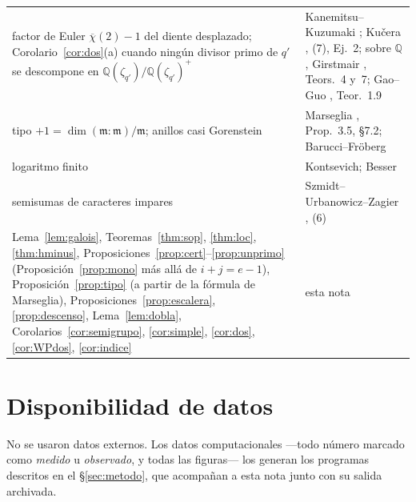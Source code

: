 \documentclass[11pt,a4paper]{article}
\theoremstyle{definition}
\newcommand{\QQ}{\mathbb{Q}}
\begin{document}
\begin{center}
\begin{tabular}{p{}p{}}
factor de Euler $\overline\chi(2)-1$ del diente desplazado; Corolario~\ref{cor:dos}(a) cuando ningún divisor primo de $q'$ se descompone en $\QQ(\zeta_{q'})/\QQ(\zeta_{q'})^+$ & Kanemitsu--Kuzumaki \cite{KK01}; Kučera \cite{Kuc01}, (7), Ej.~2; sobre $\QQ$, Girstmair \cite{Gir87}, Teors.~4 y~7; Gao--Guo \cite{GG25}, Teor.~1.9 \\
tipo $+1=\dim(\mathfrak m:\mathfrak m)/\mathfrak m$; anillos casi Gorenstein & Marseglia \cite{Mars24}, Prop.~3.5, \S7.2; Barucci--Fröberg \cite{BF97} \\
logaritmo finito & Kontsevich; Besser \cite{Bes02} \\
semisumas de caracteres impares & Szmidt--Urbanowicz--Zagier \cite{SUZ95}, (6) \\
Lema~\ref{lem:galois}, Teoremas~\ref{thm:sop}, \ref{thm:loc}, \ref{thm:hminus}, Proposiciones~\ref{prop:cert}--\ref{prop:unprimo} (Proposición~\ref{prop:mono} más allá de $i+j=e-1$), Proposición~\ref{prop:tipo} (a partir de la fórmula de Marseglia), Proposiciones~\ref{prop:escalera}, \ref{prop:descenso}, Lema~\ref{lem:dobla}, Corolarios~\ref{cor:semigrupo}, \ref{cor:simple}, \ref{cor:dos}, \ref{cor:WPdos}, \ref{cor:indice} & esta nota \\
\bottomrule
\end{tabular}
\end{center}

\section*{Disponibilidad de datos}

\noindent No se usaron datos externos. Los datos computacionales ---todo número marcado como \emph{medido} u
\emph{observado}, y todas las figuras--- los generan los programas descritos en el \S\ref{sec:metodo}, que acompañan
a esta nota junto con su salida archivada.
\end{document}
